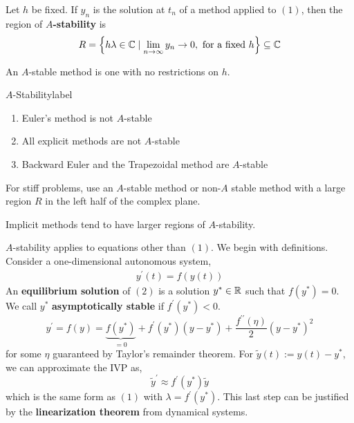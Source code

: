 \begin{defn}[$A$-Stability]
	Let $h$ be fixed. If $y_n$ is the solution at $t_n$ of a method applied to $(1)$, then the region of \textbf{$A$-stability} is
	\[R=\left\{h \lambda \in \mathbb{C} \mid \lim _{n \rightarrow \infty} y_n \rightarrow 0, \text { for a fixed } h\right\} \subseteq \mathbb{C}\]
\end{defn}

\begin{rmk}
	An $A$-stable method is one with no restrictions on $h$.
\end{rmk}

\begin{ex}{$A$-Stability}{label}
	\begin{enumerate}
		\item Euler's method is not $A$-stable
		\item All explicit methods are not $A$-stable
		\item Backward Euler and the Trapezoidal method are $A$-stable
	\end{enumerate}
\end{ex}

\begin{marginfigure}
	For stiff problems, use an $A$-stable method or non-$A$ stable method with a large region $R$ in the left half of the complex plane.
\end{marginfigure}

\begin{marginfigure}
	Implicit methods tend to have larger regions of $A$-stability.
\end{marginfigure}

\NewLine

$A$-stability applies to equations other than $(1)$. We begin with definitions. Consider a one-dimensional autonomous system,
\begin{align}
	y^{\prime}(t) = f(y(t))
\end{align}
An \textbf{equilibrium solution} of $(2)$ is a solution $y^* \in \mathbb{R}$ such that $f(y^*) = 0$. We call $y^*$ \textbf{asymptotically stable} if $f^{\prime}(y^*) < 0$.
\[y^{\prime}=f(y)=\underbrace{f\left(y^*\right)}_{=0}+f^{\prime}\left(y^*\right)\left(y-y^*\right)+\frac{f^{\prime \prime}(\eta)}{2}\left(y-y^*\right)^2\]
for some $\eta$ guaranteed by Taylor's remainder theorem. For $\tilde{y}(t):=y(t)-y^*$, we can approximate the IVP as,
\[\tilde{y}^{\prime} \approx f^{\prime}\left(y^*\right) \tilde{y}\]
which is the same form as $(1)$ with $\lambda = f^{\prime}(y^*)$. This last step can be justified by the \textbf{linearization theorem} from dynamical systems.

